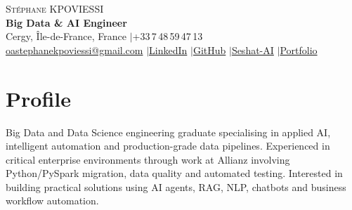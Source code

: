 \documentclass[a4paper,11pt]{article}
\begin{document}
\begin{center}
  {\Huge\scshape\color{primary} Stéphane KPOVIESSI} \\[3pt]
  {\large\textbf{Big Data \& AI Engineer}} \\[7pt]
  \small Cergy, Île-de-France, France \enspace$|$\enspace +33\,7\,48\,59\,47\,13 \\[2pt]
  \href{mailto:oastephanekpoviessi@gmail.com}{oastephanekpoviessi@gmail.com}
  \enspace$|$\enspace \href{https://linkedin.com/in/stephanekpoviessi}{LinkedIn}
  \enspace$|$\enspace \href{https://github.com/EngineerProjects}{GitHub}
  \enspace$|$\enspace \href{https://seshat-ai.com}{Seshat-AI}
  \enspace$|$\enspace \href{https://kpoviessi-stephane.vercel.app/}{Portfolio}
\end{center}
\vspace{-5pt}

\section{Profile}
\small{Big Data and Data Science engineering graduate specialising in applied AI, intelligent automation and production-grade data pipelines. Experienced in critical enterprise environments through work at Allianz involving Python/PySpark migration, data quality and automated testing. Interested in building practical solutions using AI agents, RAG, NLP, chatbots and business workflow automation.}
\vspace{4pt}
\end{document}
